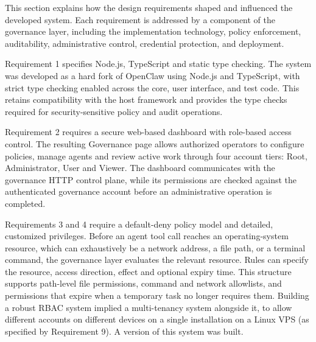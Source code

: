 This section explains how the design requirements shaped and influenced the developed system.
Each requirement is addressed by a component of the governance layer, including the
implementation technology, policy enforcement, auditability,
administrative control, credential protection, and deployment.

Requirement 1 specifies Node.js, TypeScript and static type checking. The system
was developed as a hard fork of OpenClaw using Node.js and TypeScript, with
strict type checking enabled across the core, user interface, and test code. This retains compatibility with the host framework and provides the type
checks required for security-sensitive policy and audit operations.

Requirement 2 requires a secure web-based dashboard with role-based access
control. The resulting Governance page allows authorized operators to configure
policies, manage agents and review active work through four account tiers: Root,
Administrator, User and Viewer. The dashboard communicates with the governance
HTTP control plane, while its permissions are checked against the authenticated
governance account before an administrative operation is completed.

Requirements 3 and 4 require a default-deny policy model and detailed,
customized privileges. Before an agent tool call reaches an operating-system
resource, which can exhaustively be a network address, a file path, or a terminal command, the governance layer evaluates the relevant resource. Rules can specify the resource, access
direction, effect and optional expiry time. This structure supports path-level
file permissions, command and network allowlists, and permissions that expire
when a temporary task no longer requires them. Building a robust RBAC system implied a multi-tenancy system alongside it, to allow different accounts on different devices on a single installation on a Linux VPS (as specified by Requirement 9). A version of this system was built.

